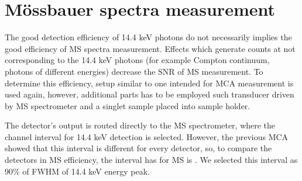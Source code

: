 \chapter{Mössbauer spectra measurement}
The good detection efficiency of 14.4 keV photons do not necessarily implies the good efficiency of MS spectra measurement. Effects which generate counts at  not corresponding to the 14.4 keV photons (for example Compton continuum, photons of different energies) decrease the SNR of MS measurement. To determine this efficiency, setup similar to one intended for MCA measurement is used again, however, additional parts has to be employed such transducer driven by MS spectrometer and a singlet sample placed into sample holder. 


\par
The detector's output is routed directly to the MS spectrometer, where the channel interval for 14.4 keV detection is selected. However, the previous MCA showed that this interval is different for every detector, so, to compare the detectors in MS efficiency, the interval has for MS is . We selected this interval as 90$\%$ of FWHM of 14.4 keV energy peak. 
